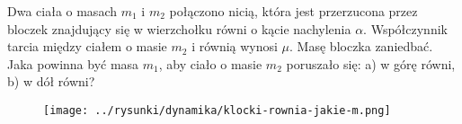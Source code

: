 Dwa ciała o masach \emph{$m_1$} i \emph{$m_2$} połączono nicią, która jest przerzucona przez bloczek znajdujący się w wierzchołku równi o kącie nachylenia \emph{$\alpha$}. Współczynnik tarcia między ciałem o masie \emph{$m_2$} i równią wynosi \emph{$\mu$}. Masę bloczka zaniedbać. Jaka powinna być masa \emph{$m_1$}, aby ciało o masie \emph{$m_2$} poruszało się: a) w górę równi, b) w dół równi?

\begin{figure}[H]
	\centering
	\texttt{[image: ../rysunki/dynamika/klocki-rownia-jakie-m.png]}
\end{figure}

